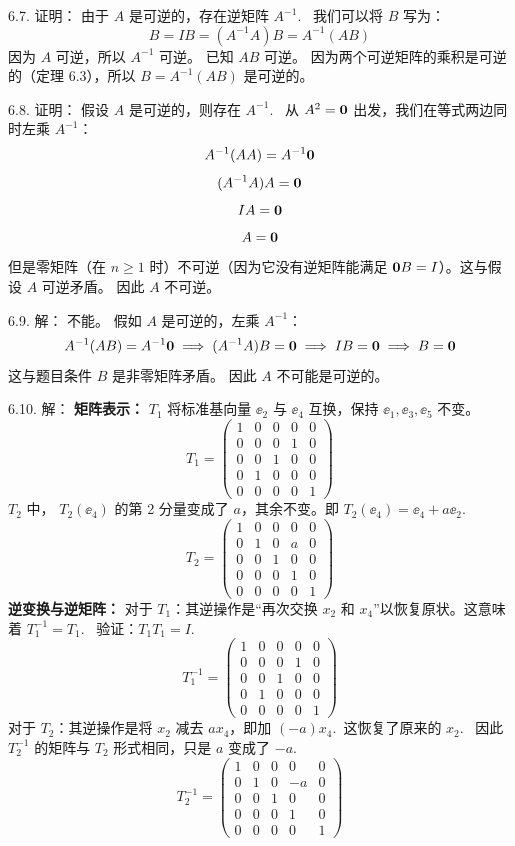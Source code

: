 \begin{exer}
6.7. 证明：
由于 $A$ 是可逆的，存在逆矩阵 $A^{-1}$.~
我们可以将 $B$ 写为：
$$ B = I B = (A^{-1} A) B = A^{-1} (AB) $$
因为 $A$ 可逆，所以 $A^{-1}$ 可逆。
已知 $AB$ 可逆。
因为两个可逆矩阵的乘积是可逆的（定理 6.3），所以 $B = A^{-1} (AB)$ 是可逆的。

6.8. 证明：
假设 $A$ 是可逆的，则存在 $A^{-1}$.~
从 $A^2 = \mathbf{0}$ 出发，我们在等式两边同时左乘 $A^{-1}$：
$$ A^{-1} (A A) = A^{-1} \mathbf{0} $$
$$ (A^{-1} A) A = \mathbf{0} $$
$$ I A = \mathbf{0} $$
$$ A = \mathbf{0} $$
但是零矩阵（在 $n \ge 1$ 时）不可逆（因为它没有逆矩阵能满足 $\mathbf{0} B = I$）。这与假设 $A$ 可逆矛盾。
因此 $A$ 不可逆。

6.9. 解：
不能。
假如 $A$ 是可逆的，左乘 $A^{-1}$：
$$ A^{-1} (AB) = A^{-1} \mathbf{0} \implies (A^{-1} A) B = \mathbf{0} \implies I B = \mathbf{0} \implies B = \mathbf{0} $$
这与题目条件 $B$ 是非零矩阵矛盾。
因此 $A$ 不可能是可逆的。

6.10. 解：
\textbf{矩阵表示：}
$T_1$ 将标准基向量 $\ee_2$ 与 $\ee_4$ 互换，保持 $\ee_1, \ee_3, \ee_5$ 不变。
$$
T_1 = \begin{pmatrix}
1 & 0 & 0 & 0 & 0 \\
0 & 0 & 0 & 1 & 0 \\
0 & 0 & 1 & 0 & 0 \\
0 & 1 & 0 & 0 & 0 \\
0 & 0 & 0 & 0 & 1
\end{pmatrix}
$$
$T_2$ 中，
$T_2(\ee_4)$ 的第 2 分量变成了 $a$，其余不变。即 $T_2(\ee_4) = \ee_4 + a\ee_2$.~
$$
T_2 = \begin{pmatrix}
1 & 0 & 0 & 0 & 0 \\
0 & 1 & 0 & a & 0 \\
0 & 0 & 1 & 0 & 0 \\
0 & 0 & 0 & 1 & 0 \\
0 & 0 & 0 & 0 & 1
\end{pmatrix}
$$
\textbf{逆变换与逆矩阵：}
对于 $T_1$：其逆操作是“再次交换 $x_2$ 和 $x_4$”以恢复原状。这意味着 $T_1^{-1} = T_1$.~
验证：$T_1 T_1 = I$.~
$$
T_1^{-1} = \begin{pmatrix}
1 & 0 & 0 & 0 & 0 \\
0 & 0 & 0 & 1 & 0 \\
0 & 0 & 1 & 0 & 0 \\
0 & 1 & 0 & 0 & 0 \\
0 & 0 & 0 & 0 & 1
\end{pmatrix}
$$
对于 $T_2$：其逆操作是将 $x_2$ 减去 $a x_4$，即加 $(-a)x_4$.~这恢复了原来的 $x_2$.~
因此 $T_2^{-1}$ 的矩阵与 $T_2$ 形式相同，只是 $a$ 变成了 $-a$.~
$$
T_2^{-1} = \begin{pmatrix}
1 & 0 & 0 & 0 & 0 \\
0 & 1 & 0 & -a & 0 \\
0 & 0 & 1 & 0 & 0 \\
0 & 0 & 0 & 1 & 0 \\
0 & 0 & 0 & 0 & 1
\end{pmatrix}
$$


\end{exer}
